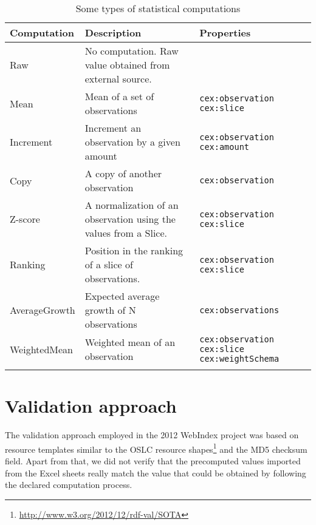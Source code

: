 \documentclass{acm_proc_article-sp}
\newcommand{\footnoteUrl}[1]{\footnote{\url{#1}}}
\begin{document}
\begin{table*}[t]
\label{table:computations}
\begin{center}
\begin{tabular}{ p{} p{} p{}}
\toprule
Computation & Description & Properties \\
\hline
Raw			& No computation. Raw value obtained from external source.
			&  \\
Mean	    & Mean of a set of observations 
			& \lstinline|cex:observation| \newline 
			  \lstinline|cex:slice| \\
Increment	& Increment an observation by a given amount 
			& \lstinline|cex:observation| \newline 
			  \lstinline|cex:amount|  \\
Copy		& A copy of another observation 
			& \lstinline|cex:observation| \\
Z-score		& A normalization of an observation using the values from a Slice. 
			& \lstinline|cex:observation| \newline 
			  \lstinline|cex:slice| \\
Ranking		& Position in the ranking of a slice of observations. 
			& \lstinline|cex:observation| \newline 
			  \lstinline|cex:slice| \\
AverageGrowth & Expected average growth of N observations
			  & \lstinline|cex:observations| \\
WeightedMean & Weighted mean of an observation
			& \lstinline|cex:observation| \newline
			  \lstinline|cex:slice|       \newline
			  \lstinline|cex:weightSchema| \\
\bottomrule\\
\end{tabular}
\caption{Some types of statistical computations}
\end{center}
\end{table*}

\section{Validation approach}

The validation approach employed in the 2012 WebIndex project was based on
 resource templates similar to the OSLC resource
 shapes\footnoteUrl{http://www.w3.org/2012/12/rdf-val/SOTA} and
 the MD5 checksum field. 
 Apart from that, we did not verify that the precomputed values imported from
 the Excel sheets really match the value that could be obtained by 
 following the declared computation process.
\end{document}
